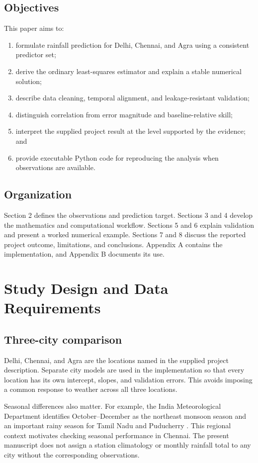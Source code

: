 \documentclass[11pt,a4paper]{article}
\newcommand{\sectionpage}[1]{\clearpage\section{#1}}
\begin{document}
\subsection{Objectives}
This paper aims to:
\begin{enumerate}
\item formulate rainfall prediction for Delhi, Chennai, and Agra using a consistent predictor set;
\item derive the ordinary least-squares estimator and explain a stable numerical solution;
\item describe data cleaning, temporal alignment, and leakage-resistant validation;
\item distinguish correlation from error magnitude and baseline-relative skill;
\item interpret the supplied project result at the level supported by the evidence; and
\item provide executable Python code for reproducing the analysis when observations are available.
\end{enumerate}

\subsection{Organization}
Section 2 defines the observations and prediction target. Sections 3 and 4 develop the mathematics and computational workflow. Sections 5 and 6 explain validation and present a worked numerical example. Sections 7 and 8 discuss the reported project outcome, limitations, and conclusions. Appendix A contains the implementation, and Appendix B documents its use.

\sectionpage{Study Design and Data Requirements}
\subsection{Three-city comparison}
Delhi, Chennai, and Agra are the locations named in the supplied project description. Separate city models are used in the implementation so that every location has its own intercept, slopes, and validation errors. This avoids imposing a common response to weather across all three locations.

Seasonal differences also matter. For example, the India Meteorological Department identifies October--December as the northeast monsoon season and an important rainy season for Tamil Nadu and Puducherry \cite{imd}. This regional context motivates checking seasonal performance in Chennai. The present manuscript does not assign a station climatology or monthly rainfall total to any city without the corresponding observations.
\end{document}
